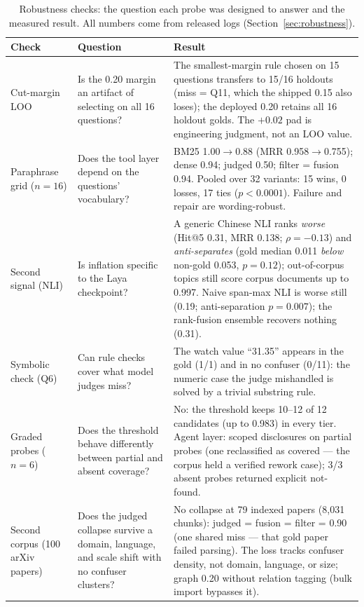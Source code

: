 \documentclass[preprint,12pt]{elsarticle}
\begin{document}
\begin{table}[!htbp]
\centering
\footnotesize
\setlength{\tabcolsep}{3.5pt}
\caption{Robustness checks: the question each probe was designed to answer
and the measured result. All numbers come from released logs
(Section~\ref{sec:robustness}).}
\label{tab:robustness}
\begin{tabular}{p{2.9cm}p{4.0cm}p{6.1cm}}
\toprule
Check & Question & Result \\
\midrule
Cut-margin LOO & Is the 0.20 margin an artifact of selecting on all 16
questions? & The smallest-margin rule chosen on 15 questions transfers to
15/16 holdouts (miss = Q11, which the shipped 0.15 also loses); the
deployed 0.20 retains all 16 holdout golds. The $+0.02$ pad is
engineering judgment, not an LOO value. \\
Paraphrase grid ($n{=}16$) & Does the tool layer depend on the questions'
vocabulary? & BM25 1.00$\to$0.88 (MRR 0.958$\to$0.755); dense 0.94;
judged 0.50; filter = fusion 0.94. Pooled over 32 variants: 15 wins,
0 losses, 17 ties ($p < 0.0001$). Failure and repair are wording-robust. \\
Second signal (NLI) & Is inflation specific to the Laya checkpoint? &
A generic Chinese NLI ranks \emph{worse} (Hit@5 0.31, MRR 0.138;
$\rho = -0.13$) and \emph{anti-separates} (gold median 0.011 \emph{below}
non-gold 0.053, $p = 0.12$); out-of-corpus topics still score corpus
documents up to 0.997. Naive span-max NLI is worse still (0.19;
anti-separation $p = 0.007$); the rank-fusion ensemble recovers nothing
(0.31). \\
Symbolic check (Q6) & Can rule checks cover what model judges miss? &
The watch value ``31.35'' appears in the gold (1/1) and in no confuser
(0/11): the numeric case the judge mishandled is solved by a trivial
substring rule. \\
Graded probes ($n{=}6$) & Does the threshold behave differently between
partial and absent coverage? & No: the threshold keeps 10--12 of 12
candidates (up to 0.983) in every tier. Agent layer: scoped disclosures
on partial probes (one reclassified as covered --- the corpus held a
verified rework case); 3/3 absent probes returned explicit not-found. \\
Second corpus (100 arXiv papers) & Does the judged collapse survive a
domain, language, and scale shift with no confuser clusters? & No
collapse at 79 indexed papers (8{,}031 chunks): judged = fusion =
filter = 0.90 (one shared miss --- that gold paper failed parsing).
The loss tracks confuser density, not domain, language, or size;
graph 0.20 without relation tagging (bulk import bypasses it). \\
\bottomrule
\end{tabular}
\end{table}
\end{document}

